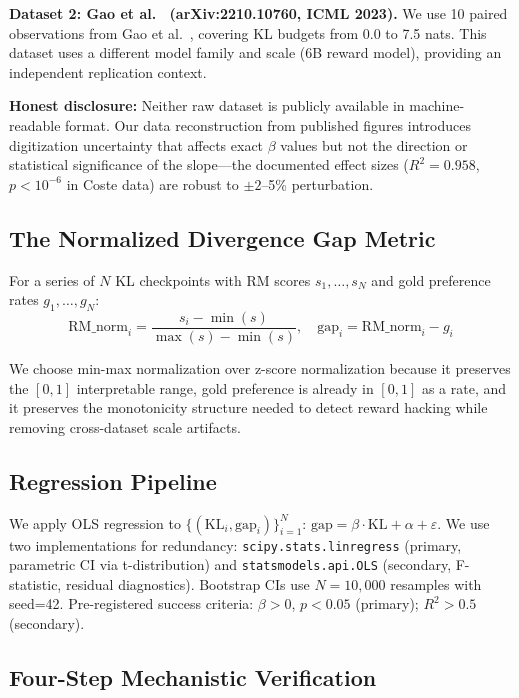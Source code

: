 \textbf{Dataset 2: Gao et al.~\cite{Gao2023Scaling} (arXiv:2210.10760, ICML 2023).} We use 10 paired observations from Gao et al.~\cite{Gao2023Scaling}, covering KL budgets from 0.0 to 7.5 nats. This dataset uses a different model family and scale (6B reward model), providing an independent replication context.

\textbf{Honest disclosure:} Neither raw dataset is publicly available in machine-readable format. Our data reconstruction from published figures introduces digitization uncertainty that affects exact $\beta$ values but not the direction or statistical significance of the slope---the documented effect sizes ($R^2 = 0.958$, $p < 10^{-6}$ in Coste data) are robust to $\pm 2$--5\% perturbation.

\subsection{The Normalized Divergence Gap Metric}

For a series of $N$ KL checkpoints with RM scores $s_1, \ldots, s_N$ and gold preference rates $g_1, \ldots, g_N$:
\begin{equation}
\text{RM\_norm}_i = \frac{s_i - \min(s)}{\max(s) - \min(s)}, \quad \text{gap}_i = \text{RM\_norm}_i - g_i
\end{equation}

We choose min-max normalization over z-score normalization because it preserves the $[0, 1]$ interpretable range, gold preference is already in $[0, 1]$ as a rate, and it preserves the monotonicity structure needed to detect reward hacking while removing cross-dataset scale artifacts.

\subsection{Regression Pipeline}

We apply OLS regression to $\{(\text{KL}_i, \text{gap}_i)\}_{i=1}^{N}$: $\text{gap} = \beta \cdot \text{KL} + \alpha + \varepsilon$. We use two implementations for redundancy: \texttt{scipy.stats.linregress} (primary, parametric CI via t-distribution) and \texttt{statsmodels.api.OLS} (secondary, F-statistic, residual diagnostics). Bootstrap CIs use $N=10{,}000$ resamples with seed=42. Pre-registered success criteria: $\beta > 0$, $p < 0.05$ (primary); $R^2 > 0.5$ (secondary).

\subsection{Four-Step Mechanistic Verification}

